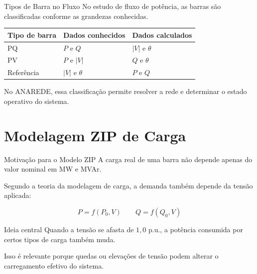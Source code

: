 \documentclass[aspectratio=169,11pt]{beamer}
\newcommand{\pu}{p.u.}
\begin{document}
\begin{frame}{Tipos de Barra no Fluxo}
  No estudo de fluxo de potência, as barras são classificadas conforme as grandezas conhecidas.

  \begin{table}
    \centering
    \begin{tabular}{lll}
      \toprule
      Tipo de barra & Dados conhecidos & Dados calculados \\
      \midrule
      PQ & $P$ e $Q$ & $|V|$ e $\theta$ \\
      PV & $P$ e $|V|$ & $Q$ e $\theta$ \\
      Referência & $|V|$ e $\theta$ & $P$ e $Q$ \\
      \bottomrule
    \end{tabular}
  \end{table}

  \vspace{0.2cm}
  No ANAREDE, essa classificação permite resolver a rede e determinar o estado operativo do sistema.
\end{frame}

\section{Modelagem ZIP de Carga}

\begin{frame}{Motivação para o Modelo ZIP}
  A carga real de uma barra não depende apenas do valor nominal em MW e MVAr.

  \vspace{0.25cm}
  Segundo a teoria da modelagem de carga, a demanda também depende da tensão aplicada:

  \[
    P = f(P_0,V)
    \qquad
    Q = f(Q_0,V)
  \]

  \begin{block}{Ideia central}
    Quando a tensão se afasta de $1{,}0$ \pu, a potência consumida por certos tipos de carga também muda.
  \end{block}

  Isso é relevante porque quedas ou elevações de tensão podem alterar o carregamento efetivo do sistema.
\end{frame}
\end{document}

